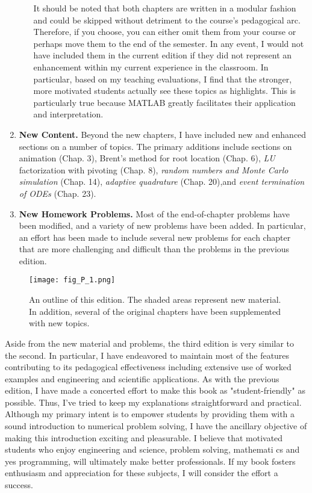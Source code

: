 \documentclass[../main.tex]{subfiles}
\begin{document}
\begin{enumerate}
\begin{itemize}
It should be noted that both chapters are written in a modular fashion and could
be skipped without detriment to the course's pedagogical arc. Therefore, if you
choose, you can either omit them from your course or perhaps move them to the
end of the semester. In any event, I would not have included them in the current
edition if they did not represent an enhancement within my current experience in
the classroom. In particular, based on my teaching evaluations, I find that the
stronger, more motivated students actually see these topics as highlights. This is
particularly true because MATLAB greatly facilitates their application and interpretation.
\end{itemize}
\item \textbf{New Content.} Beyond the new chapters, I have included new and enhanced sections on a
number of topics. The primary additions include sections on animation (Chap. 3), Brent's
method for root location (Chap. 6), \textsl{LU} factorization with pivoting (Chap. 8), \textsl{random numbers and Monte Carlo simulation} (Chap. 14), \textsl{ adaptive quadrature} (Chap. 20),and \textsl{event termination of ODEs} (Chap. 23).


\item \textbf{New Homework Problems.} Most of the end-of-chapter problems have been modified, and a variety of new problems have been added. In particular, an effort has been
made to include several new problems for each chapter that are more challenging and
difficult than the problems in the previous edition.
\end{enumerate}

\begin{figure}[H]
	\centering
	\texttt{[image: fig\_P\_1.png]}
	\caption{\textsf{An outline of this edition. The shaded areas represent new material. In addition, several of the original chapters have been supplemented with
new topics.}}
	\label{fig:fig_P_1}
\end{figure}


Aside from the new material and problems, the third edition is very similar to the second.
In particular, I have endeavored to maintain most of the features contributing to its pedagogical effectiveness including extensive use of worked examples and engineering and scientific applications. As with the previous edition, I have made a concerted effort to make this
book as "student-friendly" as possible. Thus, I’ve tried to keep my explanations straightforward and practical.
Although my primary intent is to empower students by providing them with a sound
introduction to numerical problem solving, I have the ancillary objective of making this
introduction exciting and pleasurable. I believe that motivated students who enjoy engineering and science, problem solving, mathemati cs and yes programming, will ultimately make better professionals. If my book fosters enthusiasm and appreciation for these
subjects, I will consider the effort a success.
\end{document}
